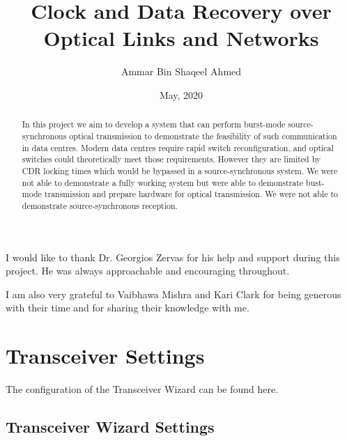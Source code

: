 \documentclass[oneside]{discothesis}
\title{Clock and Data Recovery over Optical Links and Networks}
\author{Ammar Bin Shaqeel Ahmed}
\institute{University College London}
\date{May, 2020}
\begin{document}
\frontmatter %
\maketitle
\cleardoublepage

\begin{acknowledgements}
I would like to thank Dr. Georgios Zervas for his help and support during this
project. He was always approachable and encouraging throughout.

\noindent
I am also very grateful to Vaibhawa Mishra and Kari Clark for being generous
with their time and for sharing their knowledge with me.  
\end{acknowledgements}

\begin{abstract}
In this project we aim to develop a system that can perform burst-mode
source-synchronous optical transmission to demonstrate the feasibility of
such communication in data centres. Modern data centres require
rapid switch reconfiguration, and optical switches could theoretically meet
those requirements. However they are limited by CDR locking times which would be
bypassed in a source-synchronous system.  We were not able to demonstrate a
fully working system but were able to demonstrate bust-mode transmission and
prepare hardware for optical transmission. We were not able to demonstrate
source-synchronous reception.


\end{abstract}

\tableofcontents

\mainmatter %










\appendix
\chapter{Transceiver Settings}%
\label{cha:transceiver_settings}
The configuration of the Transceiver Wizard can be found here.

\section{Transceiver Wizard Settings}%
\label{sec:transceiver_wizard_settings}
\end{document}
